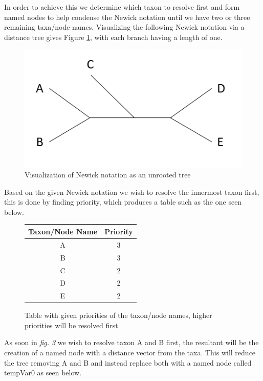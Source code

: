 \documentclass{article}
\begin{document}
In order to achieve this we determine which taxon to resolve first and form named nodes to help condense the Newick notation until we have two or three remaining taxa/node names. Visualizing the following Newick notation via a distance tree gives Figure \ref{fig:tree}, with each branch having a length of one.
\begin{figure}[h]
\includegraphics{firstTree.PNG}
\caption{Visualization of Newick notation as an unrooted tree}\label{fig:tree}
\end{figure}
Based on the given Newick notation we wish to resolve the innermost taxon first, this is done by finding priority, which produces a table such as the one seen below.

\begin{figure}
	\begin{center}
	\begin{tabular}{ |c|c| } 
		\hline
		Taxon/Node Name & Priority  \\
		\hline
		 A & 3 \\ 
		 \hline
		 B & 3 \\ 
		 \hline
		 C & 2 \\
		 \hline 
		 D & 2 \\
		 \hline 
		 E & 2 \\ 
		\hline
	\end{tabular}

	\end{center}
		\caption{Table with given priorities of the taxon/node names, higher priorities will be resolved first}
\end{figure}
As soon in \textit{fig. 3} we wish to resolve taxon A and B first, the resultant will be the creation of a named node with a distance vector from the taxa. This will reduce the tree removing A and B and instead replace both with a named node called tempVar0 as seen below. \newline
\end{document}
